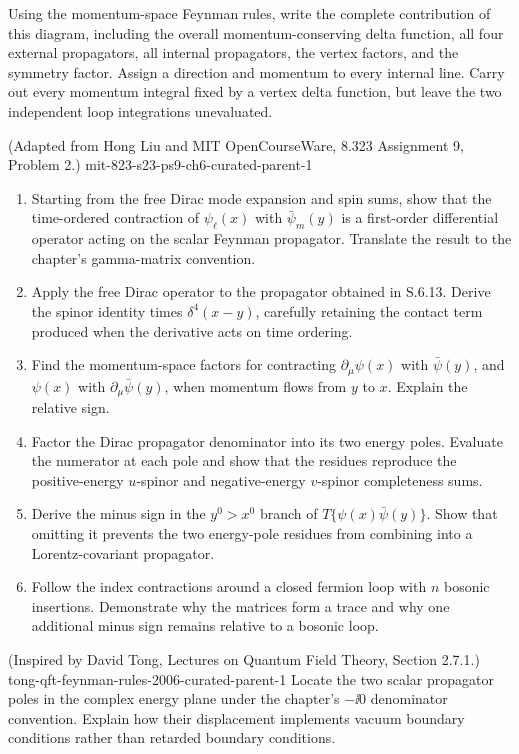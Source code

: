 \begin{enumerate}
Using the momentum-space Feynman rules, write the complete contribution of
this diagram, including the overall momentum-conserving delta function, all
four external propagators, all internal propagators, the vertex factors, and
the symmetry factor.  Assign a direction and momentum to every internal
line.  Carry out every momentum integral fixed by a vertex delta function,
but leave the two independent loop integrations unevaluated.

  {(Adapted from Hong Liu and MIT OpenCourseWare, 8.323 Assignment 9, Problem 2.)}
  {mit-823-s23-ps9-ch6-curated-parent-1}
\begin{enumerate}
\item
Starting from the free Dirac mode expansion and spin sums, show that the
time-ordered contraction of \(\psi_\ell(x)\) with \(\bar\psi_m(y)\) is a
first-order differential operator acting on the scalar Feynman propagator.
Translate the result to the chapter's gamma-matrix convention.
\item
Apply the free Dirac operator to the propagator obtained in S.6.13.
Derive the spinor identity times \(\delta^4(x-y)\), carefully retaining
the contact term produced when the derivative acts on time ordering.
\item
Find the momentum-space factors for contracting
\(\partial_\mu\psi(x)\) with \(\bar\psi(y)\), and \(\psi(x)\) with
\(\partial_\mu\bar\psi(y)\), when momentum flows from \(y\) to \(x\).
Explain the relative sign.
\item
Factor the Dirac propagator denominator into its two energy poles.
Evaluate the numerator at each pole and show that the residues reproduce
the positive-energy \(u\)-spinor and negative-energy \(v\)-spinor
completeness sums.
\item
Derive the minus sign in the \(y^0>x^0\) branch of
\(T\{\psi(x)\bar\psi(y)\}\).  Show that omitting it prevents the two
energy-pole residues from combining into a Lorentz-covariant propagator.
\item
Follow the index contractions around a closed fermion loop with \(n\)
bosonic insertions.  Demonstrate why the matrices form a trace and why
one additional minus sign remains relative to a bosonic loop.
\end{enumerate}

  {(Inspired by David Tong, Lectures on Quantum Field Theory, Section 2.7.1.)}
  {tong-qft-feynman-rules-2006-curated-parent-1}
Locate the two scalar propagator poles in the complex energy plane under
the chapter's \(-\ii0\) denominator convention.  Explain how their
displacement implements vacuum boundary conditions rather than retarded
boundary conditions.


\end{enumerate}
